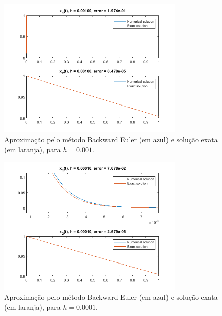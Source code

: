 \documentclass{article}
\begin{document}
\begin{enumerate}
\begin{enumerate}
                    \begin{figure}[!h]
                        \centering
                        \includegraphics[width=0.8\textwidth]{../images/backward_3.png}
                        \caption{Aproximação pelo método Backward Euler (em azul) e
                        solução exata (em laranja), para $h = 0.001$.}
                        \label{fig:backward_3}
                    \end{figure}
                
                    \begin{figure}[!h]
                        \centering
                        \includegraphics[width=0.8\textwidth]{../images/backward_4.png}
                        \caption{Aproximação pelo método Backward Euler (em azul) e
                        solução exata (em laranja), para $h = 0.0001$.}
                        \label{fig:backward_4}
                    \end{figure}

                    \clearpage


\end{enumerate}
\end{enumerate}
\end{document}
